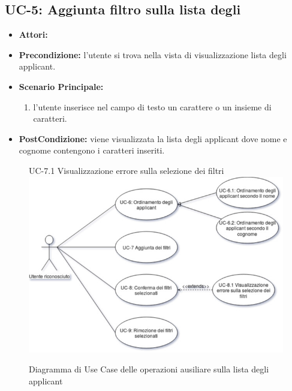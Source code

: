 \subsection{UC-5: Aggiunta filtro sulla lista degli\applicant}
\begin{itemize}
	\item \textbf{Attori:}\loggedusr
	\item \textbf{Precondizione:} l'utente si trova nella vista di visualizzazione lista degli applicant.
	\item \textbf{Scenario Principale:}
	\begin{enumerate}
		\item l'utente inserisce nel campo di testo un carattere o un insieme di caratteri.
	\end{enumerate}
	\item \textbf{PostCondizione:} viene visualizzata la lista degli applicant dove nome e cognome contengono i caratteri inseriti.
\end{itemize}


\vspace{0.5em}
\begin{figure}[!h] UC-7.1 Visualizzazione errore sulla selezione dei filtri
	\centering 
	\includegraphics[width=1\columnwidth]{immagini/usecase/UC2} 
	\caption{Diagramma di Use Case delle operazioni ausiliare sulla lista degli applicant}
	\label{figura:uc-2}
\end{figure}

